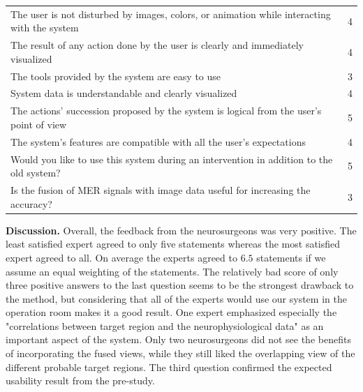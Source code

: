 \documentclass[review]{vgtc}                 %
\begin{document}
\noindent \begin{tabular}{p{} c}
\hline
The user is not disturbed by images, colors, or animation while interacting with the system	& 4\\
The result of any action done by the user is clearly and immediately visualized				& 4\\
The tools provided by the system are easy to use												& 3\\
System data is understandable and clearly visualized											& 4\\
The actions' succession proposed by the system is logical from the user's point of view		& 5\\
The system's features are compatible with all the user's expectations							& 4\\
Would you like to use this system during an intervention in addition to the old system?		& 5\\
Is the fusion of MER signals with image data useful for increasing the accuracy?				& 3\\
\hline
\end{tabular}

\noindent \textbf{Discussion.} Overall, the feedback from the neurosurgeons was very positive. The least satisfied expert agreed to only five statements whereas the most satisfied expert agreed to all. On average the experts agreed to $6.5$ statements if we assume an equal weighting of the statements. The relatively bad score of only three positive answers to the last question seems to be the strongest drawback to the method, but considering that all of the experts would use our system in the operation room makes it a good result. One expert emphasized especially the "correlations between target region and the neurophysiological data" as an important aspect of the system. Only two neurosurgeons did not see the benefits of incorporating the fused views, while they still liked the overlapping view of the different probable target regions. The third question confirmed the expected usability result from the pre-study.
\end{document}
